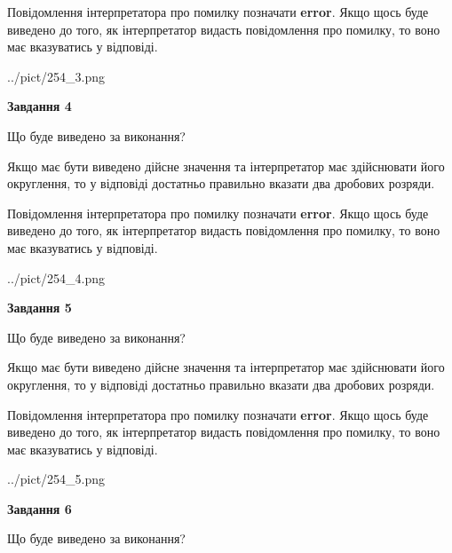 \documentclass[12pt, ukrainian]{article}
\begin{document}
{\begin {Large}
Повідомлення інтерпретатора про помилку позначати \textbf{error}.
Якщо щось буде виведено до того, як інтерпретатор видасть повідомлення про помилку, 
то воно має вказуватись у відповіді. \par

\begin{center}
	{../pict/254_3.png}
\end{center}
\newpage

{\begin {center}\textbf{Завдання 4}\end {center}}\par
Що буде виведено за виконання? \par

Якщо має бути виведено дійсне значення та інтерпретатор має здійснювати його округлення, 
то у відповіді достатньо правильно вказати два дробових розряди.

Повідомлення інтерпретатора про помилку позначати \textbf{error}.
Якщо щось буде виведено до того, як інтерпретатор видасть повідомлення про помилку, 
то воно має вказуватись у відповіді. \par

\begin{center}
	{../pict/254_4.png}
\end{center}
\newpage

{\begin {center}\textbf{Завдання 5}\end {center}}\par
Що буде виведено за виконання? \par

Якщо має бути виведено дійсне значення та інтерпретатор має здійснювати його округлення, 
то у відповіді достатньо правильно вказати два дробових розряди.

Повідомлення інтерпретатора про помилку позначати \textbf{error}.
Якщо щось буде виведено до того, як інтерпретатор видасть повідомлення про помилку, 
то воно має вказуватись у відповіді. \par

\begin{center}
	{../pict/254_5.png}
\end{center}
\newpage

{\begin {center}\textbf{Завдання 6}\end {center}}\par
Що буде виведено за виконання? \par


\end{Large}}
\end{document}
